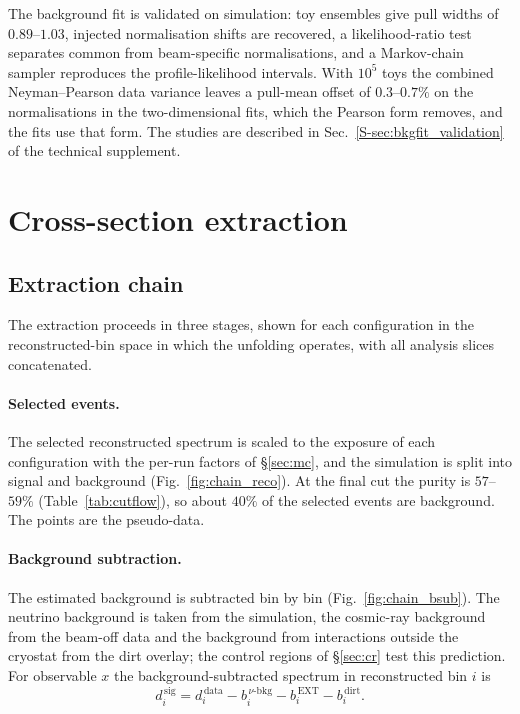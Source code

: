 \documentclass[11pt,a4paper]{article}
\newcommand{\suppref}[2]{#1~\ref{S-#2} of the technical supplement}
\begin{document}
The background fit is validated on simulation: toy ensembles give
pull widths of $0.89$--$1.03$, injected normalisation shifts are recovered, a likelihood-ratio test
separates common from beam-specific normalisations, and a Markov-chain sampler reproduces the
profile-likelihood intervals. With $10^5$ toys the combined Neyman--Pearson data variance leaves a
pull-mean offset of $0.3$--$0.7\%$ on the normalisations in the two-dimensional fits, which the
Pearson form removes, and the fits use that form. The studies are described in
\suppref{Sec.}{sec:bkgfit_validation}.


\section{Cross-section extraction}
\label{sec:unfolding}

\subsection{Extraction chain}
\label{sec:chain}

The extraction proceeds in three stages, shown for each configuration in the reconstructed-bin
space in which the unfolding operates, with all analysis slices concatenated.

\paragraph{Selected events.} The selected reconstructed spectrum is scaled to the exposure of each
configuration with the per-run factors of \S\ref{sec:mc}, and the simulation is split into signal
and background (Fig.~\ref{fig:chain_reco}). At the final cut the purity is $57$--$59\%$
(Table~\ref{tab:cutflow}), so about $40\%$ of the selected events are background. The points are
the pseudo-data.

\paragraph{Background subtraction.} The estimated background is subtracted bin by bin
(Fig.~\ref{fig:chain_bsub}). The neutrino background is taken from the simulation, the cosmic-ray
background from the beam-off data and the background from interactions outside the cryostat from
the dirt overlay; the control regions of \S\ref{sec:cr} test this prediction. For observable $x$
the background-subtracted spectrum in reconstructed bin $i$ is
\begin{equation}
  d_i^{\,\mathrm{sig}} = d_i^{\,\mathrm{data}} - b_i^{\,\nu\text{-bkg}}
                          - b_i^{\,\mathrm{EXT}} - b_i^{\,\mathrm{dirt}} .
\end{equation}
\end{document}
